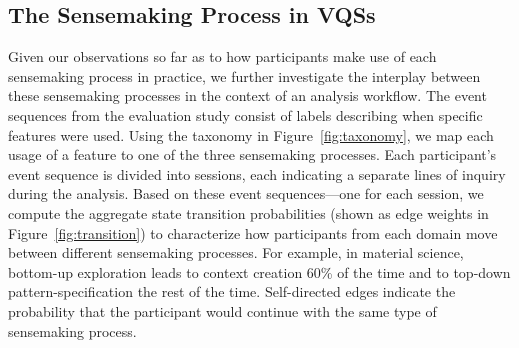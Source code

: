 \subsection{The Sensemaking Process in VQSs}
Given our observations so far as to 
how participants 
make use of each sensemaking process in practice, 
we further investigate the interplay 
between these sensemaking processes 
in the context of an analysis workflow. %
The event sequences from the evaluation study 
consist of labels describing when specific features were used. 
Using the taxonomy in Figure~\ref{fig:taxonomy}, 
we map each usage of a feature 
to one of the three sensemaking processes. 
Each participant's event sequence 
is divided into sessions, 
each indicating a separate lines of inquiry 
during the analysis. 
Based on these event sequences---one for each session, 
we compute the aggregate state transition probabilities 
(shown as edge weights in Figure~\ref{fig:transition}) 
to characterize how participants from each domain 
move between different sensemaking processes. 
For example, in material science, 
bottom-up exploration 
leads to context creation 60\% of the time 
and to top-down pattern-specification 
the rest of the time. 
Self-directed edges indicate the probability that the participant 
would continue with the same type of sensemaking process. 
